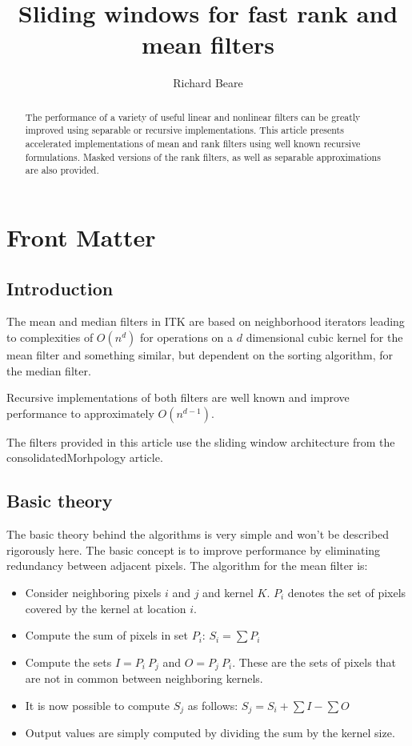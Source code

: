\documentclass{InsightArticle}
\title{Sliding windows for fast rank and mean filters}
\author{Richard Beare}
\begin{document}
\maketitle

\ifhtml
\chapter*{Front Matter\label{front}}
\fi


\begin{abstract}
\noindent
The performance of a variety of useful linear and nonlinear filters
can be greatly improved using separable or recursive
implementations. This article presents accelerated implementations of
mean and rank filters using well known recursive formulations. Masked
versions of the rank filters, as well as separable approximations are
also provided.
\end{abstract}

\tableofcontents

\section{Introduction}
The mean and median filters in ITK are based on neighborhood iterators
leading to complexities of $O(n^d)$ for operations on a $d$
dimensional cubic kernel for the mean filter and something similar,
but dependent on the sorting algorithm, for the median filter. 

Recursive implementations of both filters are well known
\cite{Huang79} and improve performance to approximately $O(n^{d-1})$.

The filters provided in this article use the sliding window
architecture from the consolidatedMorhpology article.

\section{Basic theory}
The basic theory behind the algorithms is very simple and won't be
described rigorously here. The basic concept is to improve performance
by eliminating redundancy between adjacent pixels. The algorithm for
the mean filter is:
\begin{itemize}
\item Consider neighboring pixels $i$ and $j$ and kernel $K$. $P_i$ 
      denotes the set of pixels covered by the kernel at location $i$.
\item Compute the sum of pixels in set $P_i$: $S_i = \sum P_i$
\item Compute the sets $I = P_i \ P_j$ and $O = P_j \ P_i$. These are 
      the sets of pixels that are not in common between neighboring kernels.
\item It is now possible to compute $S_j$ as follows: $S_j = S_i + \sum I - \sum O$
\item Output values are simply computed by dividing the sum by the kernel size.
\end{itemize}
\end{document}
